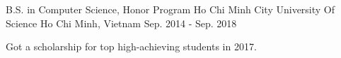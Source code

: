 \begin{cventries} %
  \cventry
    {B.S. in Computer Science, Honor Program} %
    {Ho Chi Minh City University Of Science} %
    {Ho Chi Minh, Vietnam} %
    {Sep. 2014 - Sep. 2018} %
    {
      \begin{cvitems} %
        \item {Got a scholarship for top high-achieving students in 2017.}
      \end{cvitems}
    }

\end{cventries}
